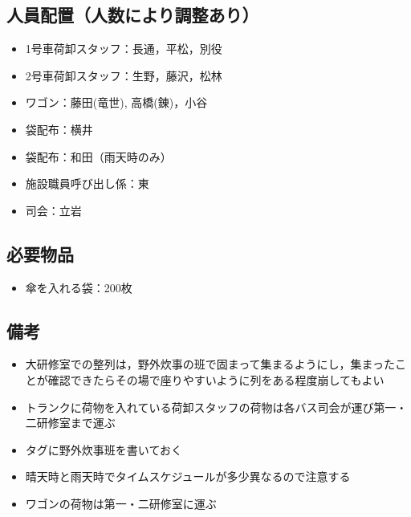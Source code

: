 \subsection{人員配置（人数により調整あり）}
\begin{itemize}
\item 1号車荷卸スタッフ：長通，平松，別役
\item 2号車荷卸スタッフ：生野，藤沢，松林
\item ワゴン：藤田(竜世), 高橋(錬)，小谷
\item 袋配布：横井
\item 袋配布：和田（雨天時のみ）
\item 施設職員呼び出し係：東
\item 司会：立岩
\end{itemize}


\subsection{必要物品}
\begin{itemize}
\item 傘を入れる袋：200枚
\end{itemize}


\subsection{備考}
\begin{itemize}
\item 大研修室での整列は，野外炊事の班で固まって集まるようにし，集まったことが確認できたらその場で座りやすいように列をある程度崩してもよい
\item トランクに荷物を入れている荷卸スタッフの荷物は各バス司会が運び第一・二研修室まで運ぶ
\item タグに野外炊事班を書いておく
\item 晴天時と雨天時でタイムスケジュールが多少異なるので注意する
\item ワゴンの荷物は第一・二研修室に運ぶ
\end{itemize}


%
